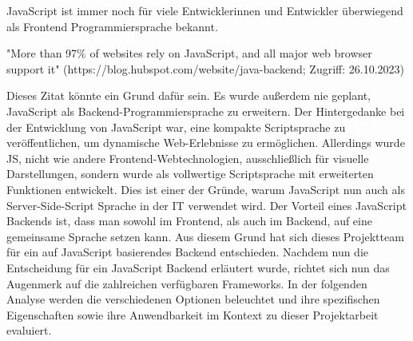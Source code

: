 JavaScript ist immer noch für viele Entwicklerinnen und Entwickler überwiegend als Frontend Programmiersprache bekannt. 

"More than 97\% of websites rely on JavaScript, and all major web browser support it"
(https://blog.hubspot.com/website/java-backend; Zugriff: 26.10.2023)

Dieses Zitat könnte ein Grund dafür sein. Es wurde außerdem nie geplant, JavaScript als Backend-Programmiersprache zu erweitern. Der Hintergedanke bei der Entwicklung von JavaScript war, eine kompakte Scriptsprache zu veröffentlichen, um dynamische Web-Erlebnisse zu ermöglichen. Allerdings wurde JS, nicht wie andere Frontend-Webtechnologien, ausschließlich für visuelle Darstellungen, sondern wurde als vollwertige Scriptsprache mit erweiterten Funktionen entwickelt. Dies ist einer der Gründe, warum JavaScript nun auch als Server-Side-Script Sprache in der IT verwendet wird.
\newline
Der Vorteil eines JavaScript Backends ist, dass man sowohl im Frontend, als auch im Backend, auf eine gemeinsame Sprache setzen kann. Aus diesem Grund hat sich dieses Projektteam für ein auf JavaScript basierendes Backend entschieden.
\newline
Nachdem nun die Entscheidung für ein JavaScript Backend erläutert wurde, richtet sich nun das Augenmerk auf die zahlreichen verfügbaren Frameworks. In der folgenden Analyse werden die verschiedenen Optionen beleuchtet und ihre spezifischen Eigenschaften sowie ihre Anwendbarkeit im Kontext zu dieser Projektarbeit evaluiert.
\cite{Backend_JavaScript}